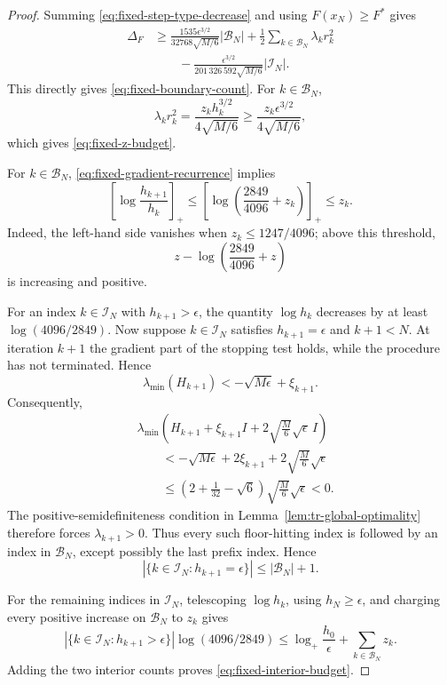 \begin{proof}
Summing \eqref{eq:fixed-step-type-decrease} and using
$F(x_N)\ge F^*$ gives
\begin{align*}
    \Delta_F
    &\ge
    \frac{
        1535\epsilon^{3/2}
    }{
        32768\sqrt{M/6}
    }
    |\mathcal B_N|
    +
    \frac12
    \sum_{k\in\mathcal B_N}\lambda_kr_k^2
    \\
    &\qquad
    -
    \frac{
        \epsilon^{3/2}
    }{
        201\,326\,592\sqrt{M/6}
    }
    |\mathcal I_N|.
\end{align*}
This directly gives
\eqref{eq:fixed-boundary-count}. For
$k\in\mathcal B_N$,
\[
    \lambda_kr_k^2
    =
    \frac{
        z_k h_k^{3/2}
    }{
        4\sqrt{M/6}
    }
    \ge
    \frac{
        z_k\epsilon^{3/2}
    }{
        4\sqrt{M/6}
    },
\]
which gives \eqref{eq:fixed-z-budget}.

For $k\in\mathcal B_N$,
\eqref{eq:fixed-gradient-recurrence} implies
\[
    \left[
        \log\frac{h_{k+1}}{h_k}
    \right]_+
    \le
    \left[
        \log\left(
            \frac{2849}{4096}+z_k
        \right)
    \right]_+
    \le
    z_k.
\]
Indeed, the left-hand side vanishes when
$z_k\le1247/4096$; above this threshold,
\[
    z-\log\left(\frac{2849}{4096}+z\right)
\]
is increasing and positive.

For an index $k\in\mathcal I_N$ with
$h_{k+1}>\epsilon$, the quantity $\log h_k$ decreases by at least
$\log(4096/2849)$.
Now suppose
$k\in\mathcal I_N$ satisfies
$h_{k+1}=\epsilon$ and $k+1<N$.
At iteration $k+1$ the gradient part of the stopping test holds, while
the procedure has not terminated. Hence
\[
    \lambda_{\min}(H_{k+1})
    <
    -\sqrt{M\epsilon}
    +
    \xi_{k+1}.
\]
Consequently,
\begin{align*}
    &
    \lambda_{\min}\!\left(
        H_{k+1}
        +
        \xi_{k+1}I
        +
        2\sqrt{\frac M6}\sqrt\epsilon\,I
    \right)
    \\
    &\qquad<
    -\sqrt{M\epsilon}
    +
    2\xi_{k+1}
    +
    2\sqrt{\frac M6}\sqrt\epsilon
    \\
    &\qquad\le
    \left(
        2+\frac1{32}-\sqrt6
    \right)
    \sqrt{\frac M6}\sqrt\epsilon
    <0.
\end{align*}
The positive-semidefiniteness condition in
Lemma~\ref{lem:tr-global-optimality} therefore forces
$\lambda_{k+1}>0$.
Thus every such floor-hitting index is followed by an index in
$\mathcal B_N$, except possibly the last prefix index. Hence
\[
    \left|
        \{k\in\mathcal I_N:h_{k+1}=\epsilon\}
    \right|
    \le
    |\mathcal B_N|+1.
\]

For the remaining indices in $\mathcal I_N$, telescoping
$\log h_k$, using $h_N\ge\epsilon$, and charging every positive
increase on $\mathcal B_N$ to $z_k$ gives
\[
    \left|
        \{k\in\mathcal I_N:h_{k+1}>\epsilon\}
    \right|
    \log(4096/2849)
    \le
    \log_+\frac{h_0}{\epsilon}
    +
    \sum_{k\in\mathcal B_N}z_k.
\]
Adding the two interior counts proves
\eqref{eq:fixed-interior-budget}.
\end{proof}


